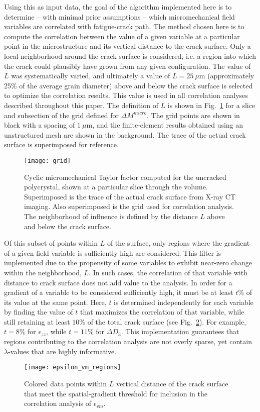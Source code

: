 Using this as input data, the goal of the algorithm implemented here is to determine -- with minimal prior assumptions -- which micromechanical field variables are correlated with fatigue-crack path. The method chosen here is to compute the correlation between the value of a given variable at a particular point in the microstructure and its vertical distance to the crack surface. Only a local neighborhood around the crack surface is considered, i.e. a region into which the crack could plausibly have grown from any given configuration. The value of $L$ was systematically varied, and ultimately a value of $L=25~\mu$m (approximately 25\% of the average grain diameter) above and below the crack surface is selected to optimize the correlation results. This value is used in all correlation analyses described throughout this paper. The definition of $L$ is shown in Fig.~\ref{fig:grid} for a slice and subsection of the grid defined for $\Delta M^{micro}$. The grid points are shown in black with a spacing of $1~\mu$m, and the finite-element results obtained using an unstructured mesh are shown in the background. The trace of the actual crack surface is superimposed for reference.  
\begin{figure}[b]
  \centering
    \texttt{[image: grid]}
    \caption{Cyclic micromechanical Taylor factor computed for the uncracked polycrystal, shown at a particular slice through the volume. Superimposed is the trace of the actual crack surface from X-ray CT imaging. Also superimposed is the grid used for correlation analysis. The neighborhood of influence is defined by the distance $L$ above and below the crack surface.}
    \label{fig:grid}
\end{figure}

Of this subset of points within $L$ of the surface, only regions where the gradient of a given field variable is sufficiently high are considered. This filter is implemented due to the propensity of some variables to exhibit near-zero change within the neighborhood, $L$. In such cases, the correlation of that variable with distance to crack surface does not add value to the analysis. In order for a gradient of a variable to be considered sufficiently high, it must be at least $t\%$ of its value at the same point. Here, $t$ is determined independently for each variable by finding the value of $t$ that maximizes the correlation of that variable, while still retaining at least $10\%$ of the total crack surface (see Fig.~\ref{fig:epsilon_vm_regions}). For example, $t=8\%$ for $\epsilon_{zz}$, while $t=11\%$ for $\Delta D_3$. This implementation guarantees that regions contributing to the correlation analysis are not overly sparse, yet contain $\lambda$-values that are highly informative. 
\begin{figure}[b]
  \centering
    \texttt{[image: epsilon\_vm\_regions]}
    \caption{Colored data points within $L$ vertical distance of the crack surface that meet the spatial-gradient threshold for inclusion in the correlation analysis of $\epsilon_{vm}$.}
    \label{fig:epsilon_vm_regions}
\end{figure}

